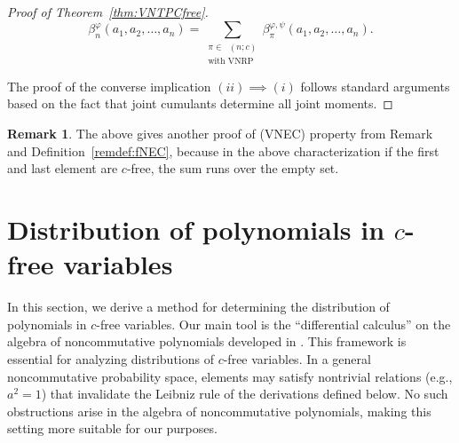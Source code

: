 \documentclass[12pt]{amsart}
\newcommand{\VNEC}{VNEC}
\DeclareMathOperator{\NCirr}{{\mathit{NC}^\textit{irr}}} %
\DeclareMathOperator{\VNRPirr}{{\mathit{VNRP}^\textit{irr}}} %
\theoremstyle{definition}
\newtheorem{remark}[theorem]{Remark}
\numberwithin{equation}{section}
\begin{document}
\begin{proof}[Proof of Theorem~\ref{thm:VNTPCfree}]
  \begin{equation*}    
    \beta_n^{\varphi} (a_1, a_2,\ldots , a_n) = 
    \sum_{ \substack{
        \pi \in \NCirr(n;c)\\
        \text{with VNRP}
      }}
    \beta_{\pi}^{\varphi,\psi}(a_1,a_2,\ldots,a_n).
  \end{equation*}


The proof of the converse implication $(ii)\implies (i)$ follows standard arguments based on the
  fact that joint cumulants determine all joint moments.  
\end{proof}

		
\begin{remark}
  The above gives another proof of (\VNEC) property from Remark and
  Definition~\ref{remdef:fNEC}, because in the above characterization if the first and last
  element are $c$-free, the sum runs over the empty set. 
\end{remark}
		
		
		
		
\section{Distribution of polynomials in $c$-free variables} \label{sec:4}
		
In this section, we derive a method for determining the distribution of
polynomials in $ c $-free variables. Our main tool is the ``differential calculus'' on
the algebra of noncommutative polynomials developed in
\cite{LehnerSzpojankowski:2023:freeint1}.
This framework is
essential for analyzing distributions of $ c $-free variables. In a general
noncommutative probability space, elements may satisfy nontrivial relations
(e.g., \( a^2 = 1 \))  that invalidate the Leibniz rule of the derivations defined
below. No such obstructions arise in the algebra of noncommutative
polynomials, making this setting more suitable for our purposes. 
		
\end{document}
